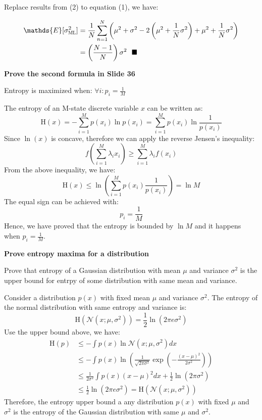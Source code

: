 \documentclass[12pt,twoside]{article}
\begin{document}
\begin{exercises}
Replace results from (2) to equation (1), we have:

\begin{equation}
  \begin{aligned}
    \mathds{E}\lbrack\sigma_{\scalebox{0.7}{ML}}^2\rbrack 
      &= \frac{1}{N}\sum_{n=1}^{N}\left( \mu^2 + \sigma^2 - 2\left(\mu^2 + \frac{1}{N}\sigma^2\right) + \mu^2 + \frac{1}{N}\sigma^2 \right) \\
      &= \left( \frac{N-1}{N} \right) \sigma^2\ \  \blacksquare
  \end{aligned}
\end{equation}
\fi

\problem \textbf{Prove the second formula in Slide 36}

Entropy is maximized when: $\forall i : p_i = \frac{1}{M}$

\ifsolution \solution{}
The entropy of an M-state discrete variable $x$ can be written as:
$$ \mbox{H}(x) = -\sum_{i=1}^{M}p(x_i)\ln p(x_i) = \sum_{i=1}^{M} p(x_i) \ln \frac{1}{p(x_i)}$$
Since $\ln(x)$ is concave, therefore we can apply the reverse Jensen's inequality:
$$ f\left( \sum_{i=1}^{M} \lambda_i x_i \right) \geq \sum_{i=1}^{M} \lambda_i f(x_i) $$
From the above inequality, we have:
$$ \mbox{H}(x) \leq \ln \left( \sum_{i=1}^{M} p(x_i) \frac{1}{p(x_i)} \right) = \ln M$$
The equal sign can be achieved with:
$$ p_i = \frac{1}{M} $$
Hence, we have proved that the entropy is bounded by $\ln M$ and it happens when $p_i = \frac{1}{M}$.
\fi

\problem \textbf{Prove entropy maxima for a distribution}

Prove that entropy of a Gaussian distribution with mean $\mu$ and variance $\sigma^2$ is the upper bound for entrpy of some distribution with same mean and variance.

\ifsolution \solution{}
Consider a distribution $p(x)$ with fixed mean $\mu$ and variance $\sigma^2$. The entropy of the normal distribution with same entropy and variance is:
$$ \mbox{H}(\mathcal{N}(x;\mu,\sigma^2)) = \frac{1}{2}\ln (2\pi e \sigma^2) $$
Use the upper bound above, we have:
\begin{equation*}
  \begin{aligned}
    \mbox{H}(p) & \leq - \int p(x) \ln \mathcal{N}(x;\mu,\sigma^2)dx \\
    & \leq - \int p(x) \ln \left(\frac{1}{\sqrt{2\pi \sigma^2}}\exp(-\frac{(x-\mu)^2}{2\sigma^2})\right) \\
    & \leq \frac{1}{2\sigma^2} \int p(x)(x-\mu)^2 dx  + \frac{1}{2}\ln (2\pi \sigma^2) \\
    & \leq \frac{1}{2} \ln (2 \pi e \sigma^2) = \mbox{H}(\mathcal{N}(x;\mu,\sigma^2)) 
  \end{aligned}
\end{equation*}
Therefore, the entropy upper bound a any distribution $p(x)$ with fixed $\mu$ and $\sigma^2$ is the entropy of the Gaussian distribution with same $\mu$ and $\sigma^2$.
\fi


\end{exercises}
\end{document}
